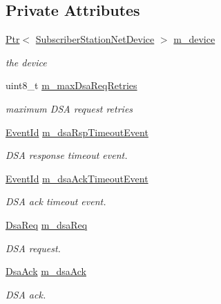 \subsection*{Private Attributes}
\begin{DoxyCompactItemize}
\item 
\hyperlink{classns3_1_1Ptr}{Ptr}$<$ \hyperlink{classns3_1_1SubscriberStationNetDevice}{Subscriber\+Station\+Net\+Device} $>$ \hyperlink{classns3_1_1SsServiceFlowManager_a8b8a4279e4e039ac2eaeb8d051792441}{m\+\_\+device}
\begin{DoxyCompactList}\small\item\em the device \end{DoxyCompactList}\item 
uint8\+\_\+t \hyperlink{classns3_1_1SsServiceFlowManager_aafa53d5538ec0c8d45d54f24c0242081}{m\+\_\+max\+Dsa\+Req\+Retries}
\begin{DoxyCompactList}\small\item\em maximum D\+SA request retries \end{DoxyCompactList}\item 
\hyperlink{classns3_1_1EventId}{Event\+Id} \hyperlink{classns3_1_1SsServiceFlowManager_a5ce17f5d3244434478627449f2e8b069}{m\+\_\+dsa\+Rsp\+Timeout\+Event}
\begin{DoxyCompactList}\small\item\em D\+SA response timeout event. \end{DoxyCompactList}\item 
\hyperlink{classns3_1_1EventId}{Event\+Id} \hyperlink{classns3_1_1SsServiceFlowManager_a369f42ac1065ef3a22d87e80164a80f9}{m\+\_\+dsa\+Ack\+Timeout\+Event}
\begin{DoxyCompactList}\small\item\em D\+SA ack timeout event. \end{DoxyCompactList}\item 
\hyperlink{classns3_1_1DsaReq}{Dsa\+Req} \hyperlink{classns3_1_1SsServiceFlowManager_aa3b7c70eaaf1c7aa9cf5776b6292d2e1}{m\+\_\+dsa\+Req}
\begin{DoxyCompactList}\small\item\em D\+SA request. \end{DoxyCompactList}\item 
\hyperlink{classns3_1_1DsaAck}{Dsa\+Ack} \hyperlink{classns3_1_1SsServiceFlowManager_a47f53035f74dc577de0fe5a6481ab1ae}{m\+\_\+dsa\+Ack}
\begin{DoxyCompactList}\small\item\em D\+SA ack. \end{DoxyCompactList}\item 

\end{DoxyCompactItemize}
